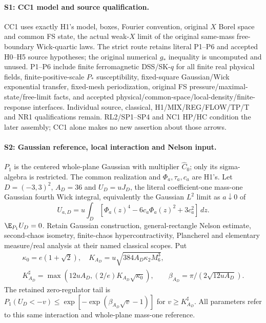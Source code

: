 \paragraph{S1: CC1 model and source qualification.}
CC1 uses exactly H1's model, boxes, Fourier convention, original $X$ Borel
space and common FS state, the actual weak-$X$ limit of the original
same-mass free-boundary Wick-quartic laws. The strict route retains literal
P1--P6 and accepted H0--H5 source hypotheses; the original numerical $g_*$
inequality is uncomputed and unused. P1--P6 include finite ferromagnetic
DSS/SK-$q$ for all finite real physical fields, finite-positive-scale $P_*$
susceptibility, fixed-square Gaussian/Wick exponential transfer, fixed-mesh
periodization, original FS pressure/maximal-state/free-limit facts, and
accepted physical/common-space/local-density/finite-response interfaces.
Individual source, classical, H1/MIX/REG/FLOW/TP/T and NR1 qualifications
remain. RL2/SP1--SP4 and NC1 HP/HC condition the later assembly; CC1 alone
makes no new assertion about those arrows.

\paragraph{S2: Gaussian reference, local interaction and Nelson input.}
$P_1$ is the centered whole-plane Gaussian with multiplier $\hat C_0$;
only its sigma-algebra is restricted. The common realization and
$\Phi_a,\tau_a,c_a$ are H1's. Let $D=(-3,3)^2$, $A_D=36$ and
$U_D=uJ_D$, the literal coefficient-one mass-one Gaussian fourth Wick
integral, equivalently the Gaussian $L^2$ limit as $a\downarrow0$ of
\[
 U_{a,D}=u\int_D[\Phi_a(z)^4-6c_a\Phi_a(z)^2+3c_a^2]\,dz.
\]
$\E_{P_1}U_D=0$. Retain Gaussian construction, general-rectangle Nelson
estimate, second-chaos isometry, finite-chaos hypercontractivity, Plancherel
and elementary measure/real analysis at their named classical scopes. Put
\begin{gather*}
 \kappa_0=e(1+\sqrt2),\quad K_{A_D}=u\sqrt{384A_D\kappa_2M_6^3},\\
 K^\sharp_{A_D}=\max(12uA_D,(2/e)K_{A_D}\sqrt{\kappa_0}),\qquad
 \beta_{A_D}=\pi/(2\sqrt{12uA_D}).
\end{gather*}
The retained zero-regulator tail is
$P_1(U_D<-v)\le\exp[-\exp(\beta_{A_D}\sqrt v-1)]$ for
$v\ge K^\sharp_{A_D}$. All parameters refer to this same interaction and
whole-plane mass-one reference.

